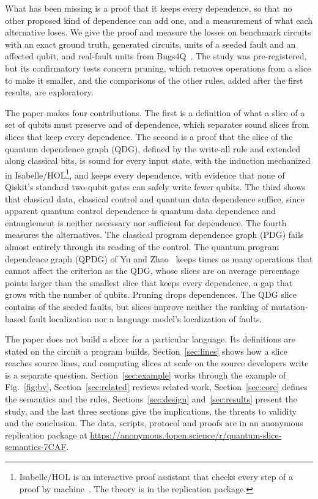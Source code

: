 What has been missing is a proof that it
keeps every dependence, so that no other proposed kind of dependence can add one, and a measurement of what each
alternative loses. We give the proof and measure the losses on \numNCircuits{} benchmark circuits with an exact ground
truth, \numFamCircuits{} generated circuits, \numRqThreeUnits{} units of a seeded fault and an affected qubit, and
\numBugsFourQUnits{} real-fault units from Bugs4Q~\cite{zhao2023bugs4q}. The study was pre-registered, but its
confirmatory tests concern pruning, which removes operations from a slice to make it smaller, and the comparisons of
the other rules, added after the first results, are exploratory.

The paper makes four contributions. The first is a definition of what a slice of a set of qubits must preserve and of
dependence, which separates sound slices from slices that keep every dependence. The second is a proof that the slice
of the quantum dependence graph (QDG), defined by the write-all rule and extended along classical bits, is sound for
every input state, with the induction mechanized in Isabelle/HOL\footnote{Isabelle/HOL is an interactive proof
assistant that checks every step of a proof by machine~\cite{nipkow2002isabelle}. The theory is in the replication
package.}, and keeps every dependence, with evidence that none of Qiskit's standard two-qubit gates can safely write
fewer qubits. The third shows that classical data, classical control and quantum data dependence suffice, since
apparent quantum control dependence is quantum data dependence and entanglement is neither necessary nor sufficient for
dependence. The fourth measures the alternatives. The classical program dependence graph (PDG) fails almost entirely
through its reading of the control. The quantum program dependence graph (QPDG) of Yu and Zhao~\cite{yu2025qpdg} keeps
\numYzLcExcessRatio{} times as many operations that cannot affect the criterion as the QDG, whose slices are on average
\numLcExcess{} percentage points larger than the smallest slice that keeps every dependence, a gap that grows with the
number of qubits. Pruning drops dependences. The QDG slice contains \numRqThreeContainLc{} of the seeded faults, but
slices improve neither the ranking of mutation-based fault localization nor a language model's localization of faults.

The paper does not build a slicer for a particular language. Its definitions are stated on the circuit a program
builds, Section~\ref{sec:lines} shows how a slice reaches source lines, and computing slices at scale on the source
developers write is a separate question. Section~\ref{sec:example} works through the example of Fig.~\ref{fig:bv},
Section~\ref{sec:related} reviews related work, Section~\ref{sec:core} defines the semantics and the rules,
Sections~\ref{sec:design} and~\ref{sec:results} present the study, and the last three sections give the implications,
the threats to validity and the conclusion. The data, scripts, protocol and proofs are in an anonymous replication
package at \url{https://anonymous.4open.science/r/quantum-slice-semantics-7CAF}.
